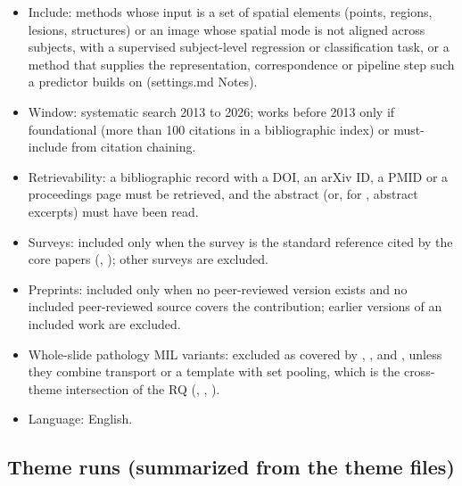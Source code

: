 \documentclass[journal,onecolumn]{IEEEtran}
\begin{document}
\begin{itemize}

\item{} Include: methods whose input is a set of spatial elements (points, regions, lesions, structures) or an image whose spatial mode is not aligned across subjects, with a supervised subject-level regression or classification task, or a method that supplies the representation, correspondence or pipeline step such a predictor builds on (settings.md Notes).

\item{} Window: systematic search 2013 to 2026; works before 2013 only if foundational (more than 100 citations in a bibliographic index) or must-include from citation chaining.

\item{} Retrievability: a bibliographic record with a DOI, an arXiv ID, a PMID or a proceedings page must be retrieved, and the abstract (or, for \cite{Beg2005Computing}, abstract excerpts) must have been read.

\item{} Surveys: included only when the survey is the standard reference cited by the core papers (\cite{Kolda2009Tensor}, \cite{Peyre2019Computational}); other surveys are excluded.

\item{} Preprints: included only when no peer-reviewed version exists and no included peer-reviewed source covers the contribution; earlier versions of an included work are excluded.

\item{} Whole-slide pathology MIL variants: excluded as covered by \cite{Campanella2019Clinical}, \cite{Lu2021CLAM}, \cite{Shao2021TransMIL} and \cite{Ilse2018AttentionMIL}, unless they combine transport or a template with set pooling, which is the cross-theme intersection of the RQ (\cite{Ren2025OTSurv}, \cite{Xu2023Multimodal}, \cite{Song2024Multimodal}).

\item{} Language: English.

\end{itemize}

\subsection{Theme runs (summarized from the theme files)}
\end{document}
